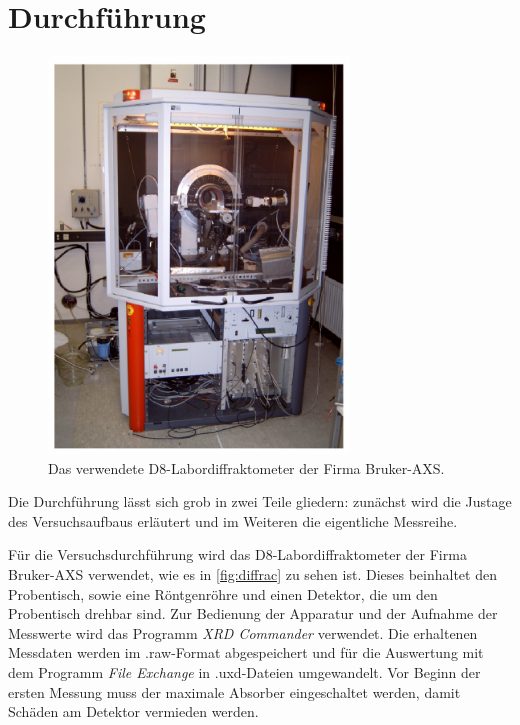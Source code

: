 \section{Durchführung}
\begin{figure}[tb]
  \centering
  \includegraphics[width=8cm,keepaspectratio]{diffraktometer.png}
  \caption{Das verwendete D8-Labordiffraktometer der Firma Bruker-AXS.}
  \label{fig:diffrac}
\end{figure}
Die Durchführung lässt sich grob in zwei Teile gliedern: zunächst wird die Justage des Versuchsaufbaus erläutert und im Weiteren die eigentliche Messreihe.

Für die Versuchsdurchführung wird das D8-Labordiffraktometer der Firma Bruker-AXS verwendet, wie es in \autoref{fig:diffrac} zu sehen ist. Dieses beinhaltet den Probentisch, sowie eine Röntgenröhre und einen Detektor, die um den Probentisch drehbar sind. Zur Bedienung der Apparatur und der Aufnahme der Messwerte wird das Programm \textit{XRD Commander} verwendet. Die erhaltenen Messdaten werden im .raw-Format abgespeichert und für die Auswertung mit dem Programm \textit{File Exchange} in .uxd-Dateien umgewandelt. Vor Beginn der ersten Messung muss der maximale Absorber eingeschaltet werden, damit Schäden am Detektor vermieden werden.


